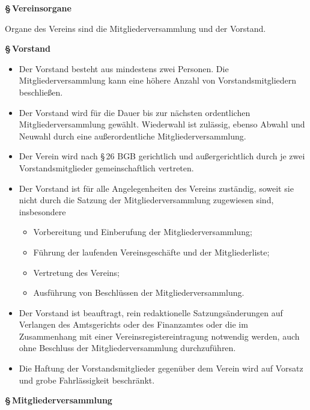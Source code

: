 \documentclass[11pt]{article}
\def\items#1{{%
  \itcounter0%
  \begin{itemize}
  #1
  \end{itemize}
}}
\let\it\item%
\def\item{
  \advance\itcounter1%
  \it[(\the\itcounter)]
}
\def\paragraf#1{
  \advance\itcounter1%
  \par\medskip
  {\large\bfseries \S\,\the\itcounter\quad#1}
  \par\smallskip
}
\begin{document}
\paragraf{Vereinsorgane}
\medskip

Organe des Vereins sind die Mitgliederversammlung und der Vorstand.
\bigskip

\paragraf{Vorstand}

\items{
   \item
     Der Vorstand besteht aus mindestens zwei Personen.
     Die Mitgliederversammlung kann eine h{\"o}here Anzahl von Vorstandsmitgliedern beschlie{\ss}en.
   \item
     Der Vorstand wird f\"ur die Dauer bis zur n\"achsten ordentlichen Mitgliederversammlung
     gew{\"a}hlt. Wiederwahl ist zul{\"a}ssig, ebenso Abwahl und Neuwahl durch eine au{\ss}erordentliche
     Mitgliederversammlung.
   \item
     Der Verein wird nach \S\,26 BGB gerichtlich und au{\ss}ergerichtlich durch je zwei
     Vorstandsmitglieder gemeinschaftlich vertreten.
   \item
     Der Vorstand ist f{\"u}r alle Angelegenheiten des Vereins zust{\"a}ndig, soweit sie nicht
     durch die Satzung der Mitgliederversammlung zugewiesen sind, insbesondere
     \items{
       \item Vorbereitung und Einberufung der Mitgliederversammlung;
       \item F{\"u}hrung der laufenden Vereinsgesch{\"a}fte und der Mitgliederliste;
       \item Vertretung des Vereins;
       \item Ausf{\"u}hrung von Beschl{\"u}ssen der Mitgliederversammlung.
     }
   \item
     Der Vorstand ist beauftragt, rein redaktionelle Satzungs{\"a}nderungen auf Verlangen
     des Amtsgerichts oder des Finanzamtes oder die im Zusammenhang mit einer Vereinsregistereintragung
     notwendig werden, auch ohne Beschluss der Mitgliederversammlung durchzuf{\"u}hren.
   \item
     Die Haftung der Vorstandsmitglieder gegen{\"u}ber dem Verein wird auf Vorsatz und grobe
     Fahrl{\"a}ssigkeit %
     beschr{\"a}nkt.
}

\paragraf{Mitgliederversammlung}
\end{document}
